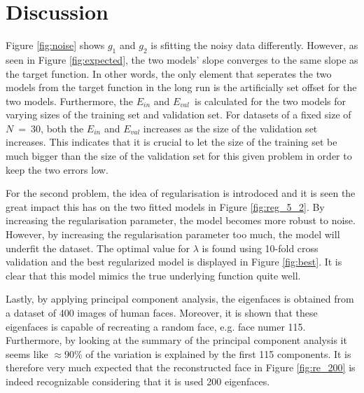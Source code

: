 \documentclass[a4paper,10pt]{article}
\begin{document}
\section{Discussion}
Figure {\ref{fig:noise}} shows $g_1$ and $g_2$ is sfitting the
noisy data differently. However, as seen in Figure {\ref{fig:expected}},
the two models' slope converges to the same slope as the target function.
In other words, the only element that seperates the two models from the
target function in the long run is the artificially set offset for the two models.
Furthermore, the $E_{in}$ and $E_{val}$ is calculated for the two models
for varying sizes of the training set and validation set. For datasets
of a fixed size of $N\ =\ 30$, both the $E_{in}$ and $E_{val}$ increases
as the size of the validation set increases. This indicates that it is
crucial to let the size of the training set be much bigger than
the size of the validation set for this given problem in order to keep
the two errors low. \newline

For the second problem, the idea of regularisation is introdoced and
it is seen the great impact this has on the two fitted models
in Figure {\ref{fig:reg_5_2}}. By increasing the regularisation
parameter, the model becomes more robust to noise. However,
by increasing the regularisation parameter too much,
the model will underfit the dataset. The optimal
value for $\lambda$ is found using 10-fold cross
validation and the best regularized model is
displayed in Figure {\ref{fig:best}}. It is
clear that this model mimics the true underlying
function quite well. \newline

Lastly, by applying principal component analysis,
the eigenfaces is obtained from a dataset of
400 images of human faces.
Moreover, it is shown that
these eigenfaces is capable of recreating a random face,
e.g. face numer 115. Furthermore,
by looking at the summary of the principal component analysis it seems
like $\approx 90\%$ of the variation is explained by the first
115 components. It is therefore very much expected that the
reconstructed face in Figure {\ref{fig:re_200}} is indeed
recognizable considering that it is used 200 eigenfaces.
\end{document}
